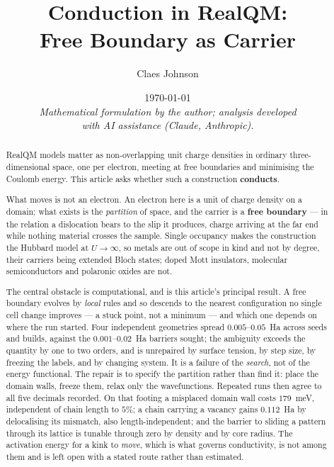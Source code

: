 \documentclass[11pt]{article}
\title{Conduction in RealQM:\\ \large Free Boundary as Carrier}
\author[1]{Claes Johnson}
\affil[1]{KTH Royal Institute of Technology, SE-100 44 Stockholm, Sweden \\
\texttt{claesjohnson@gmail.com}}
\date{\today \\[0.4em]
\small\textit{Mathematical formulation by the author; analysis developed} \\
\small\textit{with AI assistance (Claude, Anthropic).}}
\begin{document}
\maketitle

\begin{abstract}
\noindent RealQM models matter as non-overlapping unit charge densities in ordinary
three-dimensional space, one per electron, meeting at free boundaries and minimising the Coulomb
energy. This article asks whether such a construction \textbf{conducts}.

What moves is not an electron. An electron here is a unit of charge density on a domain; what
exists is the \emph{partition} of space, and the carrier is a \textbf{free boundary} --- in the
relation a dislocation bears to the slip it produces, charge arriving at the far end while nothing
material crosses the sample. Single occupancy makes the construction the Hubbard model at
$U\to\infty$, so metals are out of scope in kind and not by degree, their carriers being extended
Bloch states; doped Mott insulators, molecular semiconductors and polaronic oxides are not.

The central obstacle is computational, and is this article's principal result. A free boundary
evolves by \emph{local} rules and so descends to the nearest configuration no single cell change
improves --- a stuck point, not a minimum --- and which one depends on where the run started. Four
independent geometries spread $0.005$--$0.05$~Ha across seeds and builds, against the
$0.001$--$0.02$~Ha barriers sought; the ambiguity exceeds the quantity by one to two orders, and is
unrepaired by surface tension, by step size, by freezing the labels, and by changing system. It is a
failure of the \emph{search}, not of the energy functional. The repair is to specify the partition
rather than find it: place the domain walls, freeze them, relax only the wavefunctions. Repeated
runs then agree to all five decimals recorded. On that footing a misplaced domain wall costs
$179$~meV, independent of chain length to $5\%$; a chain carrying a vacancy gains $0.112$~Ha by
delocalising its mismatch, also length-independent; and the barrier to sliding a pattern through its
lattice is tunable through zero by density and by core radius. The activation energy for a kink to
\emph{move}, which is what governs conductivity, is not among them and is left open with a stated
route rather than estimated.


\end{abstract}
\end{document}
